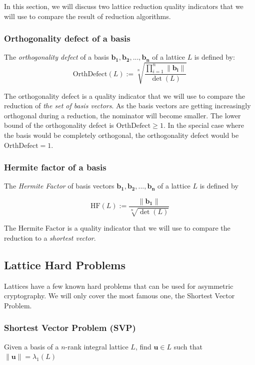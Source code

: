 \documentclass[10pt, a4paper]{article}
\renewcommand{\vec}[1]{\mathbf{#1}}
\begin{document}
In this section, we will discuss two lattice reduction quality indicators that we will use to compare the result of reduction algorithms.

\subsubsection{Orthogonality defect of a basis}
\label{sec:orthogonalityDefect}
The \emph{orthogonality defect} of a basis $\vec{b_1},\vec{b_2},...,\vec{b_n}$ of a lattice $L$ is defined by:
\[
    \text{OrthDefect}(L) :=  \sqrt[n]{\frac{\displaystyle\prod^{n}_{i=1} \|\vec{b_i}\| }{\det(L)}}
\]

The orthogonality defect is a quality indicator that we will use to compare the reduction of \emph{the set of basis vectors}. As the basis vectors are getting increasingly orthogonal during a reduction, the nominator will become smaller. The lower bound of the orthogonality defect is $\text{OrthDefect} \ge 1$. In the special case where the basis would be completely orthogonal, the orthogonality defect would be $\text{OrthDefect} = 1$.

\subsubsection{Hermite factor of a basis}
\label{sec:hermiteFactor}
The \emph{Hermite Factor} of basis vectors $\vec{b_1}, \vec{b_2},...,\vec{b_n}$ of a lattice $L$ is defined by

\[
    \text{HF}(L) := \frac{\|\vec{b_1}\|}{\sqrt[n]{\det(L)}}
\]

The Hermite Factor is a quality indicator that we will use to compare the reduction to a \emph{shortest vector}.

\subsection{Lattice Hard Problems}

Lattices have a few known hard problems that can be used for asymmetric cryptography. We will only cover the most famous one, the Shortest Vector Problem.

\subsubsection{Shortest Vector Problem (SVP)}

Given a basis of a $n$-rank integral lattice $L$, find $\vec{u} \in L$ such that $\|\vec{u}\| = \lambda_1 (L)$
\end{document}
